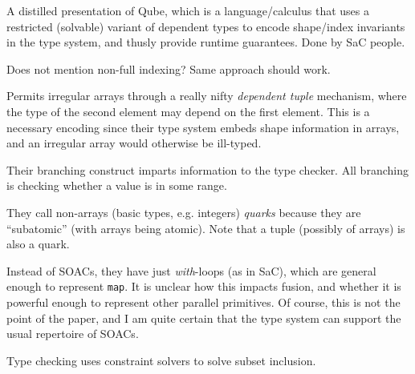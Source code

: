 \documentclass[a4paper, oneside, final]{memoir}
\begin{document}
\begin{quote}
\end{quote}

A distilled presentation of Qube, which is a language/calculus that
uses a restricted (solvable) variant of dependent types to encode
shape/index invariants in the type system, and thusly provide runtime
guarantees.  Done by SaC people.

Does not mention non-full indexing?  Same approach should work.

Permits irregular arrays through a really nifty \textit{dependent
  tuple} mechanism, where the type of the second element may depend on
the first element.  This is a necessary encoding since their type
system embeds shape information in arrays, and an irregular array
would otherwise be ill-typed.

Their branching construct imparts information to the type checker.
All branching is checking whether a value is in some range.

They call non-arrays (basic types, e.g. integers) \textit{quarks}
because they are ``subatomic'' (with arrays being atomic).  Note that
a tuple (possibly of arrays) is also a quark.

Instead of SOACs, they have just \textit{with}-loops (as in SaC),
which are general enough to represent \texttt{map}.  It is unclear how
this impacts fusion, and whether it is powerful enough to represent
other parallel primitives.  Of course, this is not the point of the
paper, and I am quite certain that the type system can support the
usual repertoire of SOACs.

Type checking uses constraint solvers to solve subset inclusion.
\end{document}
